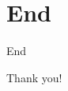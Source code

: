 \documentclass[]{beamer}
\begin{document}
%
%
%
%
%

\section*{End}

{
\framenonumber
\begin{frame}[noframenumbering]{End}
\begin{center}
\Huge Thank you!
\end{center}
\end{frame}
}

\appendix


\end{document}
